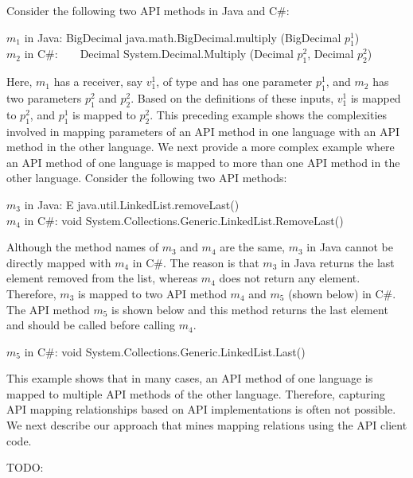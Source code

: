 Consider the following two API methods in Java and C\#:

\begin{CodeOut}
$m_1$ in Java: BigDecimal java.math.BigDecimal.multiply (BigDecimal $p_1^1$)\\
\hspace*{0.12in}$m_2$ in C\#:\ \ \ \  Decimal
System.Decimal.Multiply (Decimal $p_1^2$, Decimal $p_2^2$)
\end{CodeOut}

Here, $m_1$ has a receiver, say $v_1^1$, of type 
and has one parameter $p_1^1$, and $m_2$ has two parameters $p_1^2$
and $p_2^2$. Based on the definitions of these inputs, $v_1^1$ is
mapped to $p_1^2$, and $p_1^1$ is mapped to $p_2^2$. This preceding
example shows the complexities involved in mapping parameters of an API
method in one language with an API method in the other language. 
We next provide a more complex example where an API method of one 
language is mapped to more than one API method in the other language. Consider the following two API methods:

\begin{CodeOut}
$m_3$ in Java: E java.util.LinkedList.removeLast()\\
\hspace*{0.12in}$m_4$ in C\#: void System.Collections.Generic.LinkedList.RemoveLast()
\end{CodeOut}

Although the method names of $m_3$ and $m_4$ are the same, $m_3$ in Java
cannot be directly mapped with $m_4$ in C\#. The reason is that $m_3$ in Java
returns the last element removed from the list, whereas $m_4$ does not return any
element. Therefore, $m_3$ is mapped to two API method $m_4$ and $m_5$ (shown below) in C\#.
The API method $m_5$ is shown below and this method returns the last element
and should be called before calling $m_4$.

\begin{CodeOut}
$m_5$ in C\#: void System.Collections.Generic.LinkedList.Last()
\end{CodeOut}

This example shows that in many cases, an API method of one language is mapped
to multiple API methods of the other language. Therefore, capturing API mapping relationships
based on API implementations is often not possible. We next describe our approach
that mines mapping relations using the API client code.

TODO:

